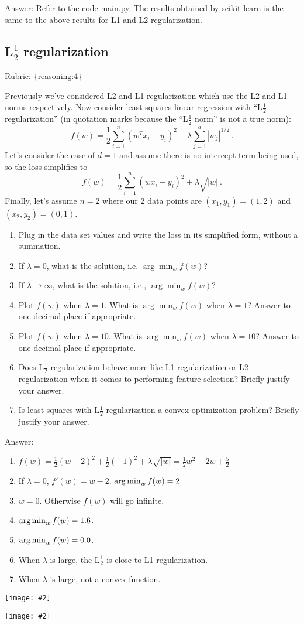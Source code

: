 \documentclass{article}
\def\rubric#1{\gre{Rubric: \{#1\}}}{}
\def\gre#1{{\color{gre}#1}}
\def\argmin{\mathop{\rm arg\,min}}
\newcommand{\centerfig}[2]{\begin{center}\texttt{[image: \#2]}\end{center}}
\begin{document}
\gre{Answer:
Refer to the code main.py. The results obtained by scikit-learn is the same to the above results for L1 and L2 regularization.
}


\subsection{L$\frac12$ regularization}
\rubric{reasoning:4}

Previously we've considered L2 and L1 regularization which use the L2 and L1 norms respectively. Now consider
least squares linear regression with ``L$\frac12$ regularization'' (in quotation marks because the ``L$\frac12$ norm'' is not a true norm):
\[
f(w) = \frac{1}{2} \sum_{i=1}^n (w^Tx_i - y_i)^2 + \lambda \sum_{j=1}^d |w_j|^{1/2} \, .
\]
Let's consider the case of $d=1$ and
assume  there is no intercept term being used, so the loss simplifies to
\[
f(w) = \frac{1}{2} \sum_{i=1}^n (wx_i - y_i)^2 + \lambda \sqrt{|w|} \, .
\]
Finally, let's assume $n=2$
where our 2 data points are $(x_1,y_1)=(1,2)$ and $(x_2,y_2)=(0,1)$.

\begin{enumerate}
\item Plug in the data set values and write the loss in its simplified form, without a summation.
\item If $\lambda=0$, what is the solution, i.e. $\arg \min_w f(w)$?
\item If $\lambda\rightarrow \infty$, what is the solution, i.e., $\arg \min_w f(w)$?
\item Plot $f(w)$ when $\lambda = 1$. What is $\arg \min_w f(w)$ when $\lambda=1$? Answer to one decimal place if appropriate.
\item Plot $f(w)$ when $\lambda = 10$. What is $\arg \min_w f(w)$ when $\lambda=10$? Answer to one decimal place if appropriate.
\item Does L$\frac12$ regularization behave more like L1 regularization or L2 regularization
when it comes to performing feature selection? Briefly justify your answer.
\item Is least squares with L$\frac12$ regularization
a convex optimization problem? Briefly justify your answer.
\end{enumerate}

\gre{Answer:
\begin{enumerate}
    \item $f(w) = \frac{1}{2}(w-2)^2 + \frac{1}{2}(-1)^2 + \lambda\sqrt{|w|}=\frac{1}{2}w^2 - 2w + \frac{5}{2}$
    \item If $\lambda = 0$, $f'(w) = w - 2$. $\argmin_w{f(w)} = 2$
    \item $w = 0$. Otherwise $f(w)$ will go infinite.
    \item $\argmin_w{f(w)} = 1.6$.
    \item $\argmin_w{f(w)} = 0.0$.
    \item When $\lambda$ is large, the L$\frac{1}{2}$ is close to L1 regularization.
    \item When $\lambda$ is large, not a convex function.
\end{enumerate}
}
\centerfig{.5}{../figs/lambda_1.png}
\centerfig{.5}{../figs/lambda_10.png}
\end{document}
